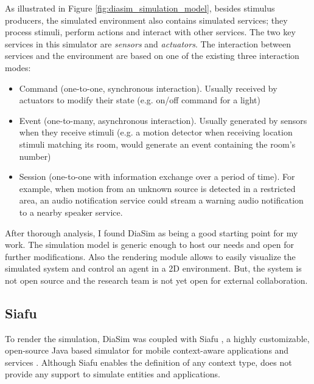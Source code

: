 As illustrated in Figure \ref{fig:diasim_simulation_model}, besides stimulus producers, the simulated environment also contains simulated services; they process stimuli, perform actions and interact with other services. The two key services in this simulator are \emph{sensors} and \emph{actuators}. The interaction between services and the environment are based on one of the existing three interaction modes:
\begin{itemize}
	\item Command (one-to-one, synchronous interaction). Usually received by actuators to modify their state (e.g. on/off command for a light)
	\item Event (one-to-many, asynchronous interaction). Usually generated by sensors when they receive stimuli (e.g. a motion detector when receiving location stimuli matching its room, would generate an event containing the room's number)
	\item Session (one-to-one with information exchange over a period of time). For example, when motion from an unknown source is detected in a restricted area, an audio notification service could stream a warning audio notification to a nearby speaker service.
\end{itemize}

After thorough analysis, I found DiaSim as being a good starting point for my work. The simulation model is generic enough to host our needs and open for further modifications. Also the rendering module allows to easily visualize the simulated system and control an agent in a 2D environment. But, the system is not open source and the research team is not yet open for external collaboration.

\subsection{Siafu}
To render the simulation, DiaSim was coupled with Siafu \cite{siafu:online}, a highly customizable, open-source Java based simulator for mobile context-aware applications and services \cite{martin2006generic}. Although Siafu enables the definition of any context type, does not provide any support to simulate entities and applications.\\

